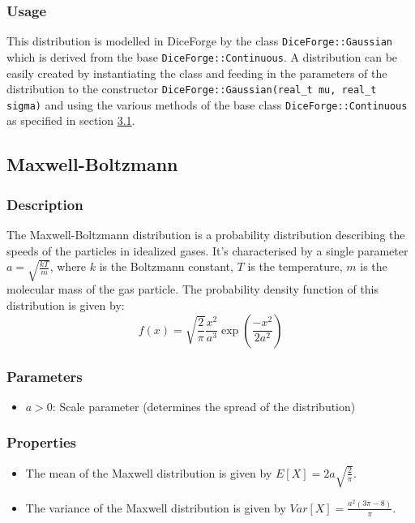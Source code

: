 \documentclass[titlepage, 11pt]{article}
\newcommand{\code}[1]
{\colorbox{light-gray}{\texttt{#1}}}
\begin{document}
\subsubsection{Usage}
This distribution is modelled in DiceForge by the class \code{DiceForge::Gaussian} which is derived from the base \code{DiceForge::Continuous}. A distribution can be easily created by instantiating the class and feeding in the parameters of the distribution to the constructor 
\code{DiceForge::Gaussian(real\_t mu, real\_t sigma)} and using the various methods of the base class \code{DiceForge::Continuous} as  specified in section \hyperref[sec:3.1]{3.1}.\newline

\subsection{Maxwell-Boltzmann}
\subsubsection{Description}
The Maxwell-Boltzmann distribution is a probability distribution describing the speeds of the particles in idealized gases. It's characterised by a single parameter $a = \sqrt{\frac{kT}{m}}$, where $k$ is the Boltzmann constant, $T$ is the temperature, $m$ is the molecular mass of the gas particle. 
\newline
\newline
The probability density function of this distribution is given by:
\begin{equation}
f(x) = \sqrt{\frac{2}{\pi}}  \frac{x^2}{a^3} \exp({\frac{-x^2}{2a^2}})
\end{equation}
\subsubsection{Parameters}
\begin{itemize}
    \item $a > 0$: Scale parameter (determines the spread of the distribution)
\end{itemize}
\subsubsection{Properties}
\begin{itemize}
    \item The mean of the Maxwell distribution is given by $E[X] = 2a \sqrt{\frac{2}{\pi}}$.
    \item The variance of the Maxwell distribution is given by $Var[X] = {\frac{a^2(3{\pi} - 8)}{\pi}}$.
\end{itemize}
\end{document}
